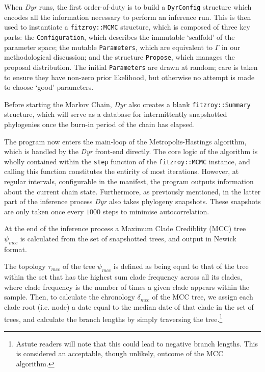 \documentclass[10pt,journal,compsoc]{IEEEtran}
\begin{document}
When \textit{Dyr} runs, the first order-of-duty is to build a \texttt{DyrConfig} structure which encodes all the information necessary to perform an inference run. This is then used to instantiate a \texttt{fitzroy::MCMC} structure, which is composed of three key parts: the \texttt{Configuration}, which describes the immutable `scaffold' of the parameter space; the mutable \texttt{Parameters}, which are equivalent to $\Gamma$ in our methodological discussion; and the structure \texttt{Propose}, which manages the proposal distribution. The initial \texttt{Parameters} are drawn at random; care is taken to ensure they have non-zero prior likelihood, but otherwise no attempt is made to choose `good' parameters.

Before starting the Markov Chain, \textit{Dyr} also creates a blank \texttt{fitzroy::Summary} structure, which will serve as a database for intermittently snapshotted phylogenies once the burn-in period of the chain has elapsed. 

The program now enters the main-loop of the Metropolis-Hastings algorithm, which is handled by the  \textit{Dyr} front-end directly. The core logic of the algorithm is wholly contained within the \texttt{step} function of the \texttt{fitzroy::MCMC} instance, and calling this function constitutes the entirity of most iterations. However, at regular intervals, configurable in the manifest, the program outputs information about the current chain state. Furthermore, as previously mentioned, in the latter part of the inference process \textit{Dyr} also takes phylogeny snapshots. These snapshots are only taken once every $1000$ steps to minimise autocorrelation.

At the end of the inference process a Maximum Clade Crediblity (MCC) tree $\psi_{mcc}$ is calculated from the set of snapshotted trees, and output in Newick format.

The topology $\tau_{mcc}$ of the tree $\psi_{mcc}$ is defined as being equal to that of the tree within the set that has the highest sum clade frequency across all its clades, where clade frequency is the number of times a given clade appears within the sample. Then, to calculate the chronology $\delta_{mcc}$ of the MCC tree, we assign each clade root (i.e. node) a date equal to the median date of that clade in the set of trees, and calculate the branch lengths by simply traversing the tree.\footnote{Astute readers will note that this could lead to negative branch lengths. This is considered an acceptable, though unlikely, outcome of the MCC algorithm.}
\end{document}
